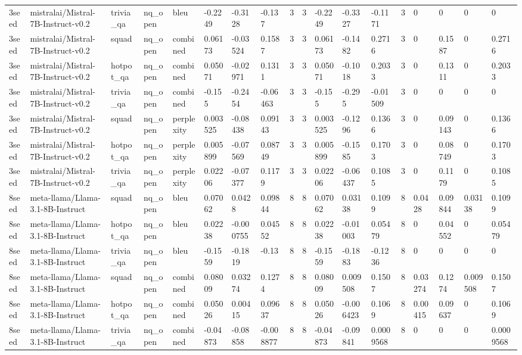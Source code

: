 \begin{tabular}{llllllllllllllllll}
3seed & mistralai/Mistral-7B-Instruct-v0.2 & trivia\_qa & nq\_open & bleu & -0.2249 & -0.3128 & -0.137 & 3 & 3 & -0.2249 & -0.3327 & -0.1171 & 3 & 0 & 0 & 0 & 0 \\
3seed & mistralai/Mistral-7B-Instruct-v0.2 & squad & nq\_open & combined & 0.06173 & -0.03524 & 0.1587 & 3 & 3 & 0.06173 & -0.1482 & 0.2716 & 3 & 0 & 0.1587 & 0 & 0.2716 \\
3seed & mistralai/Mistral-7B-Instruct-v0.2 & hotpot\_qa & nq\_open & combined & 0.05071 & -0.02971 & 0.1311 & 3 & 3 & 0.05071 & -0.1018 & 0.2033 & 3 & 0 & 0.1311 & 0 & 0.2033 \\
3seed & mistralai/Mistral-7B-Instruct-v0.2 & trivia\_qa & nq\_open & combined & -0.155 & -0.2454 & -0.06463 & 3 & 3 & -0.155 & -0.295 & -0.01509 & 3 & 0 & 0 & 0 & 0 \\
3seed & mistralai/Mistral-7B-Instruct-v0.2 & squad & nq\_open & perplexity & 0.003525 & -0.08438 & 0.09143 & 3 & 3 & 0.003525 & -0.1296 & 0.1366 & 3 & 0 & 0.09143 & 0 & 0.1366 \\
3seed & mistralai/Mistral-7B-Instruct-v0.2 & hotpot\_qa & nq\_open & perplexity & 0.005899 & -0.07569 & 0.08749 & 3 & 3 & 0.005899 & -0.1585 & 0.1703 & 3 & 0 & 0.08749 & 0 & 0.1703 \\
3seed & mistralai/Mistral-7B-Instruct-v0.2 & trivia\_qa & nq\_open & perplexity & 0.02206 & -0.07377 & 0.1179 & 3 & 3 & 0.02206 & -0.06437 & 0.1085 & 3 & 0 & 0.1179 & 0 & 0.1085 \\
8seed & meta-llama/Llama-3.1-8B-Instruct & squad & nq\_open & bleu & 0.07062 & 0.0428 & 0.09844 & 8 & 8 & 0.07062 & 0.03138 & 0.1099 & 8 & 0.0428 & 0.09844 & 0.03138 & 0.1099 \\
8seed & meta-llama/Llama-3.1-8B-Instruct & hotpot\_qa & nq\_open & bleu & 0.02238 & -0.000755 & 0.04552 & 8 & 8 & 0.02238 & -0.01003 & 0.05479 & 8 & 0 & 0.04552 & 0 & 0.05479 \\
8seed & meta-llama/Llama-3.1-8B-Instruct & trivia\_qa & nq\_open & bleu & -0.1559 & -0.1819 & -0.13 & 8 & 8 & -0.1559 & -0.1883 & -0.1236 & 8 & 0 & 0 & 0 & 0 \\
8seed & meta-llama/Llama-3.1-8B-Instruct & squad & nq\_open & combined & 0.08009 & 0.03274 & 0.1274 & 8 & 8 & 0.08009 & 0.009508 & 0.1507 & 8 & 0.03274 & 0.1274 & 0.009508 & 0.1507 \\
8seed & meta-llama/Llama-3.1-8B-Instruct & hotpot\_qa & nq\_open & combined & 0.05026 & 0.00415 & 0.09637 & 8 & 8 & 0.05026 & -0.006423 & 0.1069 & 8 & 0.00415 & 0.09637 & 0 & 0.1069 \\
8seed & meta-llama/Llama-3.1-8B-Instruct & trivia\_qa & nq\_open & combined & -0.04873 & -0.08858 & -0.008877 & 8 & 8 & -0.04873 & -0.09841 & 0.0009568 & 8 & 0 & 0 & 0 & 0.0009568 \\

\end{tabular}
